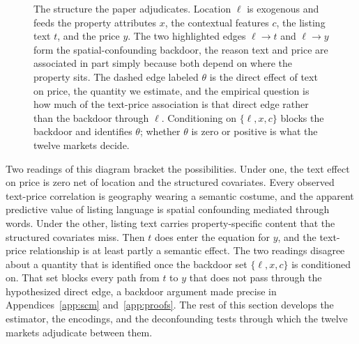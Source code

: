 \begin{figure}[H]
\centering
{}
\caption{The structure the paper adjudicates. Location $\ell$ is exogenous and
feeds the property attributes $x$, the contextual features $c$, the listing text
$t$, and the price $y$. The two highlighted edges $\ell \rightarrow t$ and
$\ell \rightarrow y$ form the spatial-confounding backdoor, the reason text and
price are associated in part simply because both depend on where the property
sits. The dashed edge labeled $\theta$ is the direct effect of text on price, the
quantity we estimate, and the empirical question is how much of the text-price
association is that direct edge rather than the backdoor through $\ell$.
Conditioning on $\{\ell, x, c\}$ blocks the backdoor and identifies $\theta$;
whether $\theta$ is zero or positive is what the twelve markets decide.}
\label{fig:dag}
\end{figure}
\FloatBarrier

Two readings of this diagram bracket the possibilities. Under one, the text effect
on price is zero net of location and the structured covariates. Every observed
text-price correlation is geography wearing a semantic costume, and the apparent
predictive value of listing language is spatial confounding mediated through words.
Under the other, listing text carries property-specific content that the
structured covariates miss. Then $t$ does enter the equation for $y$, and the
text-price relationship is at least partly a semantic effect. The two
readings disagree about a quantity that is identified once the backdoor set
$\{\ell, x, c\}$ is conditioned on. That set blocks every path from $t$ to
$y$ that does not pass through the hypothesized direct edge, a backdoor argument
made precise in Appendices~\ref{app:scm} and~\ref{app:proofs}. The rest of this
section develops the estimator, the encodings, and the deconfounding tests through
which the twelve markets adjudicate between them.

